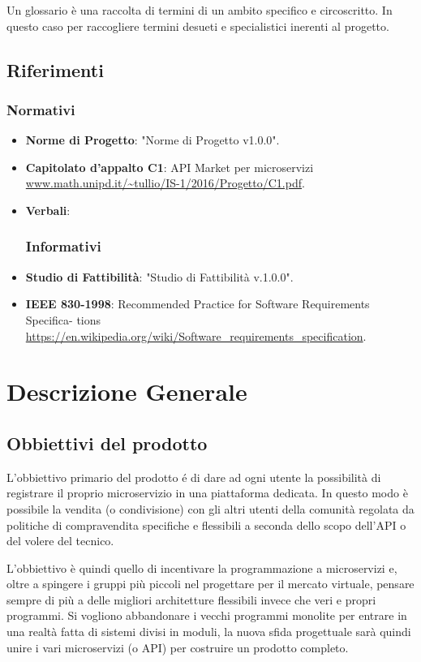 \documentclass[12pt,a4paper,titlepage]{article}
\begin{document}
	Un glossario è una raccolta di termini di un ambito specifico e circoscritto. In questo caso per raccogliere termini desueti e specialistici inerenti al progetto. 
	\subsection{Riferimenti}
	\subsubsection{Normativi}
	\begin{itemize}
		\item \textbf{Norme di Progetto}:	"Norme di Progetto v1.0.0".
		\item \textbf{Capitolato d'appalto C1}:	API Market per microservizi \\
		\textcolor{blue}{\url{www.math.unipd.it/~tullio/IS-1/2016/Progetto/C1.pdf}}. 
		\item \textbf{Verbali}:
		\subsubsection{Informativi}
		\item \textbf {Studio di Fattibilità}: "Studio di Fattibilità v.1.0.0".
		\item \textbf{IEEE 830-1998}: Recommended Practice for Software Requirements Specifica- tions \\
		\textcolor{blue}{\url{https://en.wikipedia.org/wiki/Software_requirements_specification}}.
	\end{itemize}
	
	\newpage
	
	\section{Descrizione Generale}
	\subsection{Obbiettivi del prodotto}
	L'obbiettivo primario del prodotto é di dare ad ogni utente la possibilità di registrare il proprio microservizio in una piattaforma dedicata. In questo modo è possibile la vendita (o condivisione) con gli altri utenti della comunità regolata da politiche di compravendita specifiche e flessibili a seconda dello scopo dell'API o del volere del tecnico. 
	
	L'obbiettivo è quindi quello di incentivare la programmazione a microservizi e, oltre a spingere i gruppi più piccoli nel progettare per il mercato virtuale, pensare sempre di più a delle migliori architetture flessibili invece che veri e propri programmi. Si vogliono abbandonare i vecchi programmi monolite per entrare in una realtà fatta di sistemi divisi in moduli, la nuova sfida progettuale sarà quindi unire i vari microservizi (o API) per costruire un prodotto completo.
\end{document}
